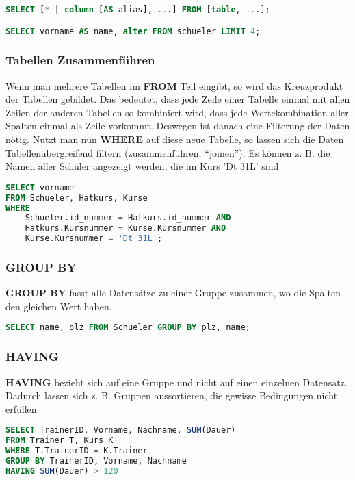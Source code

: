 \begin{lstlisting}[language=sql]
SELECT [* | column [AS alias], ...] FROM [table, ...];

SELECT vorname AS name, alter FROM schueler LIMIT 4;
\end{lstlisting}

\subsubsection{Tabellen Zusammenführen}

Wenn man mehrere Tabellen im \textbf{FROM} Teil eingibt, so wird das Kreuzprodukt der
Tabellen gebildet. Das bedeutet, dass jede Zeile einer Tabelle einmal mit allen
Zeilen der anderen Tabellen so kombiniert wird, dass jede Wertekombination
aller Spalten einmal als Zeile vorkommt. Deswegen ist danach eine Filterung der
Daten nötig. Nutzt man nun \textbf{WHERE} auf diese neue Tabelle, so lassen
sich die Daten Tabellenübergreifend filtern (zusammenführen, ``joinen'').
Es können z. B. die Namen aller Schüler angezeigt werden, die im Kurs 'Dt 31L' sind

\begin{lstlisting}[language=sql]
SELECT vorname
FROM Schueler, Hatkurs, Kurse
WHERE 
    Schueler.id_nummer = Hatkurs.id_nummer AND
    Hatkurs.Kursnummer = Kurse.Kursnummer AND
    Kurse.Kursnummer = 'Dt 31L';
\end{lstlisting}

\subsubsection{GROUP BY}

\textbf{GROUP BY} fasst alle Datensätze zu einer Gruppe zusammen, wo die
Spalten den gleichen Wert haben.

\begin{lstlisting}[language=sql]
SELECT name, plz FROM Schueler GROUP BY plz, name;
\end{lstlisting}

\subsubsection{HAVING}

\textbf{HAVING} bezieht sich auf eine Gruppe und nicht auf einen einzelnen Datensatz.
Dadurch lassen sich z. B. Gruppen aussortieren, die gewisse Bedingungen nicht erfüllen.

\begin{lstlisting}[language=sql]
SELECT TrainerID, Vorname, Nachname, SUM(Dauer)
FROM Trainer T, Kurs K
WHERE T.TrainerID = K.Trainer
GROUP BY TrainerID, Vorname, Nachname
HAVING SUM(Dauer) > 120 
\end{lstlisting}

